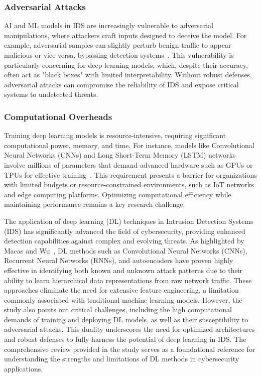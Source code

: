 \subsubsection{Adversarial Attacks} AI and ML models in IDS are increasingly vulnerable to adversarial manipulations, where attackers craft inputs designed to deceive the model. For example, adversarial samples can slightly perturb benign traffic to appear malicious or vice versa, bypassing detection systems~\cite{Alotaibi2023AML}. This vulnerability is particularly concerning for deep learning models, which, despite their accuracy, often act as "black boxes" with limited interpretability. Without robust defenses, adversarial attacks can compromise the reliability of IDS and expose critical systems to undetected threats.

\subsubsection{Computational Overheads} Training deep learning models is resource-intensive, requiring significant computational power, memory, and time. For instance, models like Convolutional Neural Networks (CNNs) and Long Short-Term Memory (LSTM) networks involve millions of parameters that demand advanced hardware such as GPUs or TPUs for effective training~\cite{Gutierrez2023}. This requirement presents a barrier for organizations with limited budgets or resource-constrained environments, such as IoT networks and edge computing platforms. Optimizing computational efficiency while maintaining performance remains a key research challenge.

The application of deep learning (DL) techniques in Intrusion Detection Systems (IDS) has significantly advanced the field of cybersecurity, providing enhanced detection capabilities against complex and evolving threats. As highlighted by Macas and Wu~\cite{macas2020review}, DL methods such as Convolutional Neural Networks (CNNs), Recurrent Neural Networks (RNNs), and autoencoders have proven highly effective in identifying both known and unknown attack patterns due to their ability to learn hierarchical data representations from raw network traffic. These approaches eliminate the need for extensive feature engineering, a limitation commonly associated with traditional machine learning models. However, the study also points out critical challenges, including the high computational demands of training and deploying DL models, as well as their susceptibility to adversarial attacks. This duality underscores the need for optimized architectures and robust defenses to fully harness the potential of deep learning in IDS. The comprehensive review provided in the study serves as a foundational reference for understanding the strengths and limitations of DL methods in cybersecurity applications.

